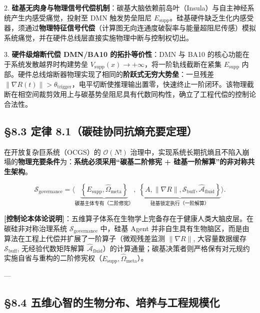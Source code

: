 \documentclass[11pt,a4paper,oneside]{ctexart}
\begin{document}
2. \textbf{硅基无肉身与物理信号代偿机制}：碳基大脑依赖前岛叶（Insula）与自主神经系统产生内感受痛觉，投射至 DMN 触发势垒阻尼 $E_{\text{supp}}$。硅基硬件缺乏生化内感受器，须通过\textbf{物理特征信号代偿}（计算图无向连通度破裂率与能量超阻尼传感）模拟系统痛觉，并在硬件总线层直接实施物理中断与控制权切出。

3. \textbf{硬件级熔断代偿 DMN/BA10 的拓扑等价性}：DMN 与 BA10 的核心功能在于系统发散越界时构建势垒 $V_{\text{supp}}(x) \to +\infty$，将一阶轨线截断在紧集 $E_{\text{supp}}$ 内部。硬件总线熔断器物理实现了相同的\textbf{阶跃式无穷大势垒}：一旦残差 $\|\nabla R(t)\| > \theta_{\text{trigger}}$，电平切断使推理输出置零，快速终止一阶闭环。该物理截断在相空间裁剪效用上与碳基势垒阻尼具有代数同构性，确立了工程代偿的控制论合法性。


\subsection{§8.3 定律 8.1（碳硅协同抗熵充要定理）}

在开放复杂巨系统（OCGS）的 $\mathcal{O}(N!)$ 治理中，实现系统长期抗熵且不陷入崩塌的\textbf{物理充要条件}为：\textbf{系统必须采用“碳基二阶修宪 + 硅基一阶解算”的非对称共生架构}。


\begin{equation}
\mathcal{S}_{\text{governance}} = \Big\langle \underbrace{\left\{ E_{\text{supp}}, \hat{\Omega}_{\text{meta}} \right\}}_{\text{碳基主体专有（二阶修宪）}}, \; \underbrace{\left\{ A, \|\nabla R\|, \mathcal{S}_{\text{buff}}, \hat{\mathcal{A}}_{\text{fluid}} \right\}}_{\text{硅基锁定执行（一阶解算）}} \Big\rangle.
\end{equation}

\begin{notebox}
\textbf{[控制论本体论说明]}：五维算子体系在生物学上完备存在于健康人类大脑皮层。在碳硅非对称治理系统 $\mathcal{S}_{\text{governance}}$ 中，硅基 Agent 并非自生具有生物脑区，而是由算法在工程上代偿并扩展了一阶算子（微观残差监测 $\|\nabla R\|$, 大容量数据缓存 $\mathcal{S}_{\text{buff}}$, 无经验代数矩阵解算 $\hat{\mathcal{A}}_{\text{fluid}}$）的计算通量；碳基决策者则严格保有对元规约实施自省与重构的二阶修宪权（$E_{\text{supp}}, \hat{\Omega}_{\text{meta}}$）。
\end{notebox}

---


\subsection{§8.4 五维心智的生物分布、培养与工程规模化}
\end{document}
